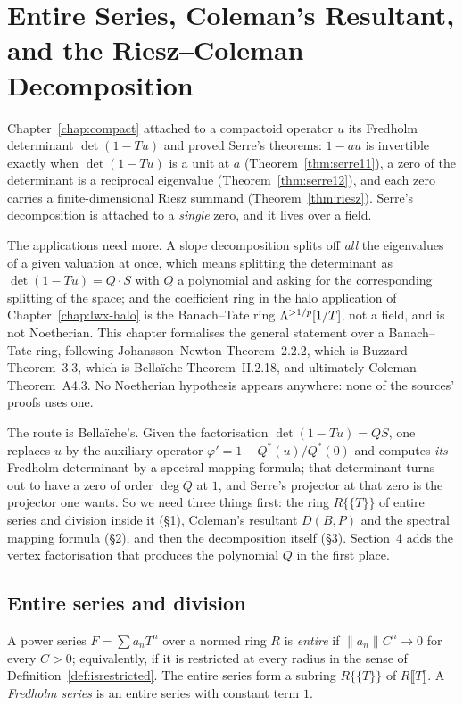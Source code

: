 \chapter{Entire Series, Coleman's Resultant, and the Riesz--Coleman Decomposition}
\label{chap:riesz-coleman}

Chapter~\ref{chap:compact} attached to a compactoid operator $u$ its Fredholm determinant
$\det(1-Tu)$ and proved Serre's theorems: $1-au$ is invertible exactly when $\det(1-Tu)$ is a
unit at $a$ (Theorem~\ref{thm:serre11}), a zero of the determinant is a reciprocal eigenvalue
(Theorem~\ref{thm:serre12}), and each zero carries a finite-dimensional Riesz summand
(Theorem~\ref{thm:riesz}).  Serre's decomposition is attached to a \emph{single} zero, and it
lives over a field.

The applications need more.  A slope decomposition splits off \emph{all} the eigenvalues of a
given valuation at once, which means splitting the determinant as $\det(1-Tu) = Q\cdot S$ with
$Q$ a polynomial and asking for the corresponding splitting of the space; and the coefficient
ring in the halo application of Chapter~\ref{chap:lwx-halo} is the Banach--Tate ring
$\Lambda^{>1/p}[1/T]$, not a field, and is not Noetherian.  This chapter formalises the general
statement over a Banach--Tate ring, following Johansson--Newton \cite{JN} Theorem~2.2.2, which
is Buzzard \cite{Buzzard} Theorem~3.3, which is Bella\"iche \cite{Bellaiche} Theorem~II.2.18,
and ultimately Coleman \cite{Coleman} Theorem~A4.3.  No Noetherian hypothesis appears anywhere:
none of the sources' proofs uses one.

The route is Bella\"iche's.  Given the factorisation $\det(1-Tu) = QS$, one replaces $u$ by the
auxiliary operator $\varphi' = 1 - Q^{*}(u)/Q^{*}(0)$ and computes \emph{its} Fredholm
determinant by a spectral mapping formula; that determinant turns out to have a zero of order
$\deg Q$ at $1$, and Serre's projector at that zero is the projector one wants.  So we need
three things first: the ring $R\{\{T\}\}$ of entire series and division inside it (\S1),
Coleman's resultant $D(B,P)$ and the spectral mapping formula (\S2), and then the decomposition
itself (\S3).  Section~4 adds the vertex factorisation that produces the polynomial $Q$ in the
first place.

\section{Entire series and division}

\begin{definition}
  \label{def:isentire}
  \leanok
  A power series $F = \sum a_n T^n$ over a normed ring $R$ is \emph{entire} if
  $\lVert a_n\rVert C^n \to 0$ for every $C > 0$; equivalently, if it is restricted at every
  radius in the sense of Definition~\ref{def:isrestricted}.  The entire series form a subring
  $R\{\{T\}\}$ of $R\llbracket T\rrbracket$.  A \emph{Fredholm series} is an entire series with
  constant term $1$.
\end{definition}

